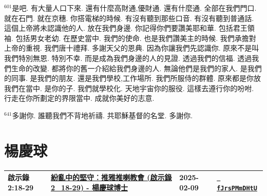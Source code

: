 \documentclass{book}
\begin{document}
$^{601}$是吧.
有大量人口下來.
還有什麼高財通,優財通.
還有什麼通.
全部在我們門口.
就在石門.
就在京穗.
你搭電梯的時候.
有沒有聽到那些口音.
有沒有聽到普通話.
這個上帝將未認識他的人.
放在我們身邊.
你記得你們要讚美耶和華.
包括君王領袖.
包括男女老幼.
在歷史當中.
我們的使命.
也是我們讚美主的時候.
我們承擔對上帝的重視.
我們唐十禮拜.
多謝天父的恩典.
因為你讓我們先認識你.
原來不是叫我們特別無恩.
特別不幸.
而是成為我們身邊的人的見證.
透過我們的信福.
透過我們生命的改變.
都將你的舊一介紹給我們身邊的人.
無論他們是我們的家人.
是我們的同事.
是我們的朋友.
還是我們學校,工作場所.
我們所服侍的群體.
原來都是你放我們在當中.
是你的子.
我們就學校化.
天地宇宙你的服役.
這樣去遵行你的吩咐.
行走在你所劃定的界限當中.
成就你美好的志意.

$^{641}$多謝你.
誰聽我們不背地祈禱.
共耶穌基督的名堂.
多謝你.
\newpage



\chapter{楊慶球}\label{ch:preacher3}
\begin{multicols}{3}
\minitoc
\end{multicols}
{ \scriptsize


\begin{xltabular}{\textwidth}{|p{0.15\textwidth} p{0.6\textwidth}|p{0.07\textwidth} p{0.1\textwidth}|}
\hline
啟示錄 2:18-29 & \hyperref[sec:fJrsPMmDHtU]{紛亂中的堅守︰推雅推喇教會 (啟示錄2\_18-29) - 楊慶球博士} & 2025-02-09 & \href{https://youtube.com/watch?v=fJrsPMmDHtU}{\texttt{ fJrsPMmDHtU}} \\
\hline
\end{xltabular}
}
\newpage
\end{document}
